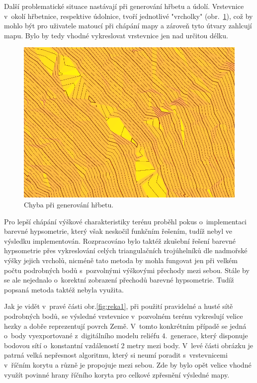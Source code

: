 \documentclass[a4paper, 12pt, oneside, titlepage]{article} %
\begin{document}
Další problematické situace nastávají při generování hřbetu a údolí. Vrstevnice v~okolí hřbetnice, respektive údolnice, tvoří jednotlivé "vrcholky" (obr.~\ref{fig:chyba_hrbet}), což by mohlo být pro uživatele matoucí při chápání mapy a zároveň tyto útvary zahlcují mapu. Bylo by tedy vhodné vykreslovat vrstevnice jen nad určitou délku.

 \begin{figure}[!htb]
	\centering
	\includegraphics[scale=0.8]{obrazky/chyba_hrbet.png} 
	\caption{Chyba při generování hřbetu.
	}
	\label{fig:chyba_hrbet}
\end{figure} 
\FloatBarrier

Pro lepší chápání výškové charakteristiky terénu proběhl pokus o~implementaci barevné hypsometrie, který však neskočil funkčním řešením, tudíž nebyl ve výsledku implementován. Rozpracováno bylo taktéž zkušební řešení barevné hypsometrie přes vykreslování celých triangulačních trojúhelníků dle nadmořské výšky jejich vrcholů, nicméně tato metoda by mohla fungovat jen při velkém počtu podrobných bodů s~pozvolnými výškovými přechody mezi sebou. Stále by se ale nejednalo o~korektní zobrazení přechodů barevné hypsometrie. Tudíž popsaná metoda taktéž nebyla využita.

Jak je vidět v~pravé části obr.\ref{fig:reka1}, při použití pravidelné a husté sítě podrobných bodů, se výsledné vrstevnice v~pozvolném terénu vykreslují velice hezky a dobře reprezentují povrch Země. V~tomto konkrétním případě se jedná o~body vyexportované z~digitálního modelu reliéfu 4.~generace, který disponuje bodovou sítí o~konstantní vzdáleností 2 metry mezi body. V~levé části obrázku je patrná velká nepřesnost algoritmu, který si neumí poradit s~vrstevnicemi v~říčním korytu a různě je propojuje mezi sebou. Zde by bylo opět velice vhodné využít povinné hrany říčního koryta pro celkové zpřesnění výsledné mapy.
\end{document}

